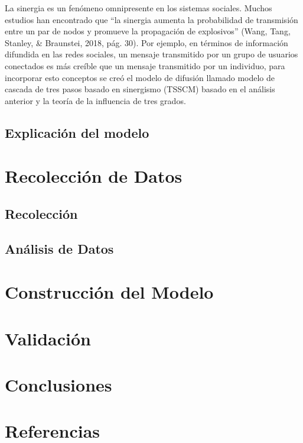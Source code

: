 \documentclass{article}
\begin{document}
 La sinergia es un fenómeno omnipresente en los sistemas sociales. Muchos estudios han encontrado que “la sinergia aumenta la probabilidad de transmisión entre un par de nodos y promueve la propagación de explosivos” (Wang, Tang, Stanley, \& Braunstei, 2018, pág. 30). Por ejemplo, en términos de información difundida en las redes sociales, un mensaje transmitido por un grupo de usuarios conectados es más creíble que un mensaje transmitido por un individuo, para incorporar esto conceptos se creó el modelo de difusión llamado modelo de cascada de tres pasos basado en sinergismo (TSSCM) basado en el análisis anterior y la teoría de la influencia
 de tres grados.
 \subsection{Explicación del modelo}
 
\section{Recolección de Datos}
 
 \subsection{Recolección}
 \subsection{Análisis de Datos}	
	
	
\section{Construcción del Modelo}

\section{Validación}

\section{Conclusiones}
	
	
\section{Referencias}

\printbibliography
\end{document}
